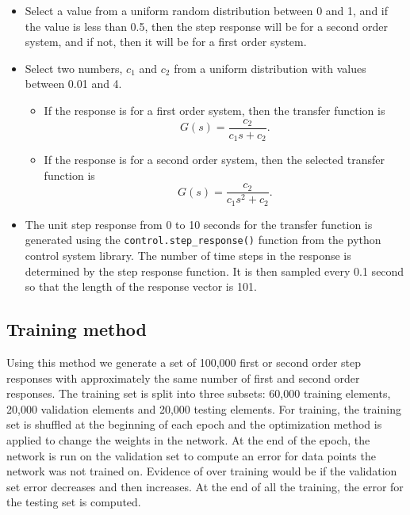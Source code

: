   \begin{itemize}

    \item Select a value from a uniform random distribution between 0 and 1, and
    if the value is less than 0.5, then the step response will be for a second
    order system, and if not, then it will be for a first order system.

    \item Select two numbers, $c_1$ and $c_2$ from a uniform distribution with
    values between 0.01 and 4.

    \begin{itemize}

      \item If the response is for a first order system, then the transfer
      function is
      \[
        G(s) = \frac{c_2}{c_1 s + c_2}.
      \]

      \item If the response is for a second order system, then the selected
      transfer function is
      \[
        G(s) = \frac{c_2}{c_1 s^2 + c_2}.
      \]

    \end{itemize}

	\item The unit step response from 0 to 10 seconds for the transfer function
	  is generated using the \texttt{control.step\_response()} function from the
	  python control system library. The number of time steps in the response is
	  determined by the step response function. It is then sampled every 0.1
	  second so that the length of the response vector is 101.

\end{itemize} 

\subsection{Training method}

    Using this method we generate a set of 100,000 first or second order step
    responses with approximately the same number of first and second order
    responses. The training set is split into three subsets: 60,000 training
    elements, 20,000 validation elements and 20,000 testing elements. For
    training, the training set is shuffled at the beginning of each epoch and
    the optimization method is applied to change the weights in the network.  At
    the end of the epoch, the network is run on the validation set to compute an
    error for data points the network was not trained on. Evidence of
    over training would be if the validation set error decreases and then
    increases.  At the end of all the training, the error for the testing set is
    computed.

